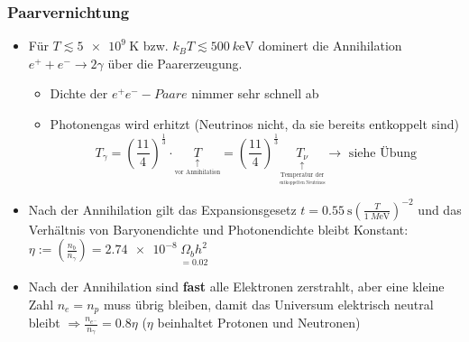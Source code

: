 \subsubsection{Paarvernichtung}
\begin{itemize}
	\item Für $T\lesssim\SI{5e9}{\K}$ bzw. $k_BT\lesssim \SI{500}{k\eV}$ dominert die Annihilation $e^++e^-\to 2\gamma$ über die Paarerzeugung.
		\begin{itemize}
			\item Dichte der $e^+e^--Paare$ nimmer sehr schnell ab
			\item Photonengas wird erhitzt (Neutrinos nicht, da sie bereits entkoppelt sind)
				\begin{equation*}
					T_\gamma=\left(\frac{11}{4}\right)^\frac{1}{3}\cdot \underset{\underset{\text{vor Annihilation}}{\uparrow}}{T}=\left(\frac{11}{4}\right)^\frac{1}{3}\underset{\underset{\underset{\text{entkoppelten Neutrinos}}{\text{Temperatur der}}}{\uparrow}}{T_\nu}\to \text{ siehe Übung}
				\end{equation*}
		\end{itemize}
	\item Nach der Annihilation gilt das Expansionsgesetz $t=\SI{0.55}{\s}\left(\frac{T}{\SI{1}{M\eV}}\right)^{-2}$ und das Verhältnis von Baryonendichte und Photonendichte bleibt Konstant: $\eta:=\left(\frac{n_b}{n_\gamma}\right)=\SI{2.74e-8}{\underset{=\num{0.02}}{\Omega_bh^2}}$
	\item Nach der Annihilation sind \textbf{fast} alle Elektronen zerstrahlt, aber eine kleine Zahl $n_e=n_p$ muss übrig bleiben, damit das Universum elektrisch neutral bleibt $\Rightarrow \frac{n_{e^-}}{n_\gamma}=\num{0.8}\eta$ ($\eta$ beinhaltet Protonen und Neutronen)
\end{itemize}
